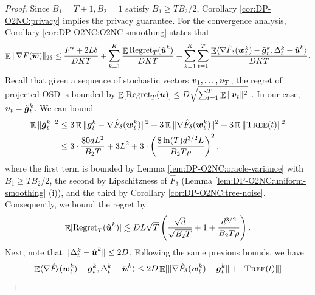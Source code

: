 \begin{proof}
Since $B_1=T+1,B_2=1$ satisfy $B_1\ge TB_2/2$, Corollary \ref{cor:DP-O2NC:privacy} implies the privacy guarantee.
For the convergence analysis, Corollary \ref{cor:DP-O2NC:O2NC-smoothing} states that
\begin{equation*}
    \mathop{\mathbb{E}}\|\nabla F(\overline {{\boldsymbol{w}}})\|_{2\delta} 
    \le \frac{F^*+2L\delta}{DKT} + \sum_{k=1}^K\frac{\mathop{\mathbb{E}}\mathrm{Regret}_T(\hat{{\boldsymbol{u}}}^k)}{DKT} + \sum_{k=1}^K\sum_{t=1}^T \frac{ \mathop{\mathbb{E}}\langle \nabla\hat F_\delta({\boldsymbol{w}}_t^k)-\tilde{{\boldsymbol{g}}}_t^k, \Delta_t^k-\hat{{\boldsymbol{u}}}^k\rangle }{DKT}.
\end{equation*}
Recall that given a sequence of stochastic vectors ${\boldsymbol{v}}_1,\ldots,{\boldsymbol{v}}_T$, the regret of projected OSD is bounded by $\mathop{\mathbb{E}}[\mathrm{Regret}_T({\boldsymbol{u}})] \le D\sqrt{\sum_{t=1}^T\mathop{\mathbb{E}}\|{\boldsymbol{v}}_t\|^2}$ \citep{orabona2019modern}. In our case, ${\boldsymbol{v}}_t=\tilde{{\boldsymbol{g}}}_t^k$. We can bound
\begin{align*}
    \mathop{\mathbb{E}}\|\tilde{{\boldsymbol{g}}}_t^k\|^2
    &\le 3\mathop{\mathbb{E}}\|{\boldsymbol{g}}_t^k - \nabla\hat F_\delta({\boldsymbol{w}}_t^k)\|^2 + 3\mathop{\mathbb{E}}\|\nabla\hat F_\delta({\boldsymbol{w}}_t^k)\|^2 + 3\mathop{\mathbb{E}}\|{\normalfont\textsc{Tree}}(t)\|^2 \\
    &\le 3\cdot \frac{80dL^2}{B_2T} + 3L^2 + 3\cdot\left(\frac{8\ln(T)d^{3/2}L}{B_2T\rho}\right)^2,
\end{align*}
where the first term is bounded by Lemma \ref{lem:DP-O2NC:oracle-variance} with $B_1\ge TB_2/2$, the second by Lipschitzness of $\hat F_\delta$ (Lemma \ref{lem:DP-O2NC:uniform-smoothing} (i)), and the third by Corollary \ref{cor:DP-O2NC:tree-noise}. Consequently, we bound the regret by
\begin{equation}
    \mathop{\mathbb{E}}[\mathrm{Regret}_T(\hat{{\boldsymbol{u}}}^k)]
    \lesssim DL\sqrt{T}\left( \frac{\sqrt{d}}{\sqrt{B_2T}} + 1 + \frac{d^{3/2}}{B_2T\rho} \right).
    \label{eq:DP-O2NC:convergence-1}
\end{equation}
Next, note that $\|\Delta_t^k-\hat{{\boldsymbol{u}}}^k\| \le 2D$. Following the same previous bounds, we have
\begin{align}
    \E\langle \nabla\hat F_\delta(\vecw_t^k)-\tilde\vecg_t^k, \Delta_t^k-\hat\vecu^k\rangle
    &\le 2D\E[\|\nabla\hat F_\delta(\vecw_t^k)-\vecg_t^k\| + \|\tree(t)\|] \notag \\

\end{align}
\end{proof}
